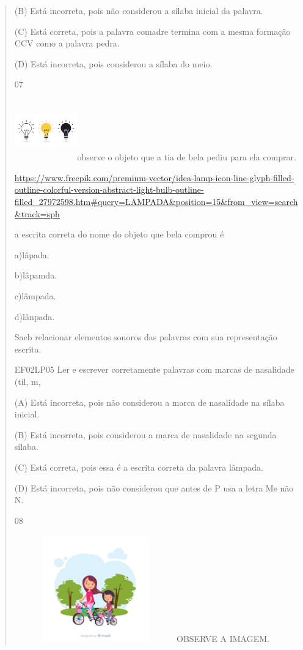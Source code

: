 {{{{\begin{verse}
{{\begin{escolha}
{{{{{(B) Está incorreta, pois não considerou a sílaba inicial da palavra.

(C) Está correta, pois a palavra comadre termina com a mesma formação
CCV como a palavra pedra.

(D) Está incorreta, pois considerou a sílaba do meio.

\num{07}

\includegraphics[width=1.07025in,height=1.04487in]{media/image178.jpeg}observe
o objeto que a tia de bela pediu para ela comprar.

\url{https://www.freepik.com/premium-vector/idea-lamp-icon-line-glyph-filled-outline-colorful-version-abstract-light-bulb-outline-filled_27972598.htm\#query=LAMPADA\&position=15\&from_view=search\&track=sph}

a escrita correta do nome do objeto que bela comprou é

a)lâpada.

b)lâpamda.

c)lâmpada.

d)lânpada.

Saeb relacionar elementos sonoros das palavras com sua representação
escrita.

EF02LP05 Ler e escrever corretamente palavras com marcas de nasalidade
(til, m,

(A) Está incorreta, pois não considerou a marca de nasalidade na sílaba
inicial.

(B) Está incorreta, pois considerou a marca de nasalidade na segunda
sílaba.

(C) Está correta, pois essa é a escrita correta da palavra lâmpada.

(D) Está incorreta, pois não considerou que antes de P usa a letra Me
não N.

\num{08}

\includegraphics[width=2.76266in,height=1.82051in]{media/image179.png}OBSERVE
A IMAGEM.

}}}}}
\end{escolha}}}
\end{verse}}}}}
